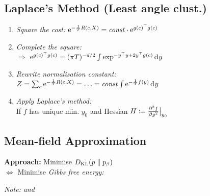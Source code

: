 \subsection{Laplace's Method \quad\normalfont\sffamily (Least angle clust.)}

\begin{enumerate}
    \item \textit{Square the cost:}\quad
        $\mathrm{e}^{-\frac1T R(c,X)} = \mathit{const} \cdot \mathrm{e}^{g(c)^\top g(c)}$
    \item \textit{Complete the square:}\quad
        \\
        $\Rightarrow$ $\eu^{g(c)^\top g(c)} = (\pi T)^{-d/2} \int \exp^{-y^\top y + 2 y^\top g(c)} \diff y$
    \item \textit{Rewrite normalisation constant:}\\
        $Z = \sum_c \eu^{-\frac1T R(c,X)} = \ldots = \mathit{const} \int \eu^{-\frac1T f(y)} \diff y$
    \item \textit{Apply Laplace's method:}\\\vspace{-3pt}
        If $f$ has unique min. $y_0$ and Hessian $H\coloneqq \pderiv[2]{f}{y}\big\vert_{y_0}$\\\vspace{-4pt}
\end{enumerate}


\subsection{Mean-field Approximation}
\iffalse
    \textbf{Idea:}\enskip
    Approximate $p_\beta$ (Gibbs) with a ``simple'', \\\phantom{\textbf{Idea:}}\enskip
    factorisable distribution $p = p_1 \cdots p_N$.
\fi

\textbf{Approach:}\enskip
Minimise $D_\mathrm{KL}(p\parallel p_\beta)$\\
$\iff$ Minimise \emph{Gibbs free energy:}\\
\hfill {}

\quad \textit{Note:}\enskip
{} \enskip \textit{and} \enskip {}

